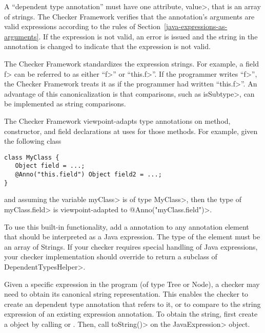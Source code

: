 A ``dependent type annotation''
must have one attribute, \<value>, that is an
array of strings.  The Checker Framework verifies that the annotation's
arguments are valid expressions according to the rules of
Section~\ref{java-expressions-as-arguments}.  If
the expression is not valid, an error is issued and the string in the
annotation is changed to indicate that the expression is not valid.

The Checker Framework standardizes the expression strings.  For example, a
field \<f> can be referred to as either ``\<f>'' or ``\<this.f>''.  If the
programmer writes ``\<f>'', the Checker Framework treats it
as if the programmer had written ``\<this.f>''.
An advantage of this canonicalization is
that comparisons, such as \<isSubtype>, can be implemented as string comparisons.

The Checker Framework viewpoint-adapts type annotations on method, constructor,
and field declarations at uses for those methods.  For example, given the
following class

\begin{Verbatim}
class MyClass {
   Object field = ...;
   @Anno("this.field") Object field2 = ...;
}
\end{Verbatim}
and assuming the variable \<myClass> is of type \<MyClass>, then the type of
\<myClass.field> is viewpoint-adapted to \<@Anno("myClass.field")>.

To use this built-in functionality, add a  annotation
to any annotation element that should be interpreted as a Java expression.  The type of the
element must be an array of Strings.  If your checker requires special handling of Java expressions,
your checker implementation should override
to return a subclass of \<DependentTypesHelper>.

Given a specific expression in the program (of type Tree or Node), a
checker may need to obtain its canonical string representation.  This
enables the checker to create an dependent type annotation that refers to
it, or to compare to the string expression of an existing expression
annotation.
To obtain the string, first create a
 object by calling
 or
.
Then, call \<toString()> on the \<JavaExpression> object.


